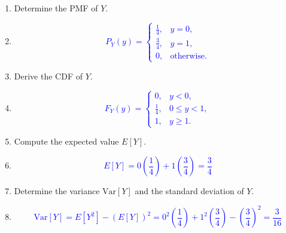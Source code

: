 \documentclass[12pt]{article}
\begin{document}
\begin{enumerate}
    \item[(a)] Determine the PMF of $Y$.
    \item[] \textcolor{blue}{\[P_Y(y) =
\begin{cases}
\frac{1}{4}, & y = 0, \\[6pt]
\frac{3}{4}, & y = 1, \\[6pt]
0, & \text{otherwise}.
\end{cases}
\]}
    \item[(b)] Derive the CDF of $Y$.
    \item[] \textcolor{blue}{\[F_Y(y) =
\begin{cases}
0, & y < 0, \\[6pt] 
\frac{1}{4}, & 0 \leq y < 1, \\[6pt]
1, & y \geq 1.
\end{cases}
\]}
    \item[(c)] Compute the expected value $E[Y]$.
    \item[] \textcolor{blue}{\[E[Y] = 0\left(\frac{1}{4}\right) + 1\left(\frac{3}{4}\right) = \frac{3}{4}\]}
    \item[(d)] Determine the variance $\mathrm{Var}[Y]$ and the standard deviation of $Y$.
    \item[] \textcolor{blue}{\[\mathrm{Var}[Y] = E[Y^2] - (E[Y])^2 = 0^2\left(\frac{1}{4}\right) + 1^2\left(\frac{3}{4}\right) - \left(\frac{3}{4}\right)^2 = \frac{3}{16}\]}
\end{enumerate}
\end{document}
